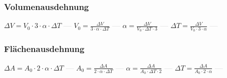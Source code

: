 \subsubsection{Volumenausdehnung} 
\begin{minipage}{0.45\textwidth} 
\end{minipage} 
\begin{minipage}{0.45\textwidth} 
 
\end{minipage} 
$ \Delta V = V_{0} \cdot 3\cdot \alpha \cdot \Delta T $ \textcolor{lightgray}{\textbf{---}} 
$ V_{0}  = \frac{  \Delta V}{3\cdot \alpha \cdot \Delta T} $ \textcolor{lightgray}{\textbf{---}} 
$ \alpha  = \frac{  \Delta V}{V_{0} \cdot \Delta T\cdot 3} $ \textcolor{lightgray}{\textbf{---}} 
$ \Delta T = \frac{  \Delta V}{V_{0} \cdot 3\cdot \alpha } $ \textcolor{lightgray}{\textbf{---}} 

\subsubsection{Flächenausdehnung} 
\begin{minipage}{0.45\textwidth} 
\end{minipage} 
\begin{minipage}{0.45\textwidth} 
 
\end{minipage} 
$ \Delta A = A_{0} \cdot 2\cdot \alpha \cdot \Delta T $ \textcolor{lightgray}{\textbf{---}} 
$ A_{0}  = \frac{ \Delta A}{2\cdot \alpha \cdot \Delta T} $ \textcolor{lightgray}{\textbf{---}} 
$ \alpha  = \frac{ \Delta A}{A_{0} \cdot \Delta T\cdot 2} $ \textcolor{lightgray}{\textbf{---}} 
$ \Delta T = \frac{ \Delta A}{A_{0} \cdot 2\cdot \alpha } $ \textcolor{lightgray}{\textbf{---}} 

